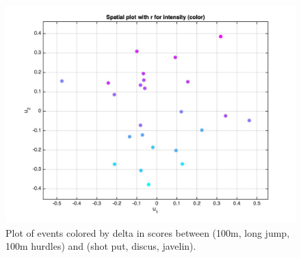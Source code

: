 \documentclass[12pt]{exam}
\begin{document}
\begin{questions}
   \begin{figure}[hpb!]
    \centering
    \includegraphics[scale=0.3]{data/spatial_delta.jpg}
    \caption{Plot of events colored by delta in scores between (100m, long jump, 100m hurdles) and (shot put, discus, javelin).}
    \label{fig:intensity_plot_delta}
  \end{figure}

\end{questions}

\end{document}
